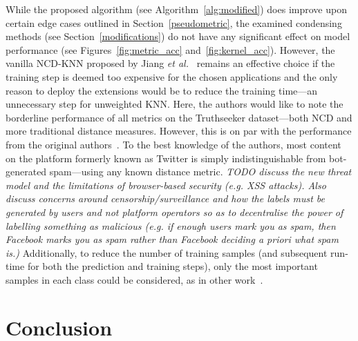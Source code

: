 \documentclass[preprint,12pt]{article}
\newcommand{\cm}[1]{\textit{{\color{blue}#1}}}
\begin{document}
While the proposed algorithm (see Algorithm~\ref{alg:modified}) does improve upon certain edge cases outlined in Section~\ref{pseudometric}, the examined condensing methods (see Section~\ref{modifications}) do not have any significant effect on model performance (see Figures~\ref{fig:metric_acc} and~\ref{fig:kernel_acc}). 
However, the vanilla NCD-KNN proposed by Jiang \textit{et al.}~\cite{jiang2022less} remains an effective choice if the training step is deemed too expensive for the chosen applications and the only reason to deploy the extensions would be to reduce the training time---an unnecessary step for unweighted KNN.
Here, the authors would like to note the borderline performance of all metrics on the Truthseeker dataset---both NCD and more traditional distance measures.
However, this is on par with the performance from the original authors~\cite{truthseeker}.
To the best knowledge of the authors, most content on the platform formerly known as Twitter is simply indistinguishable from bot-generated spam---using any known distance metric.
\cm{TODO discuss the new threat model  and the limitations of browser-based security (e.g. XSS attacks). Also discuss concerns around censorship/surveillance and how the labels must be generated by users and not platform operators so as to decentralise the power of labelling something as malicious (e.g. if enough users mark you as spam, then Facebook marks you as spam rather than Facebook deciding a priori what spam is.)}
Additionally, to reduce the number of training samples (and subsequent run-time for both the prediction and training steps), only the most important samples in each class could be considered, as in other work~\cite{amal2011survey}.





\section{Conclusion}
\label{conclusion}
\end{document}
